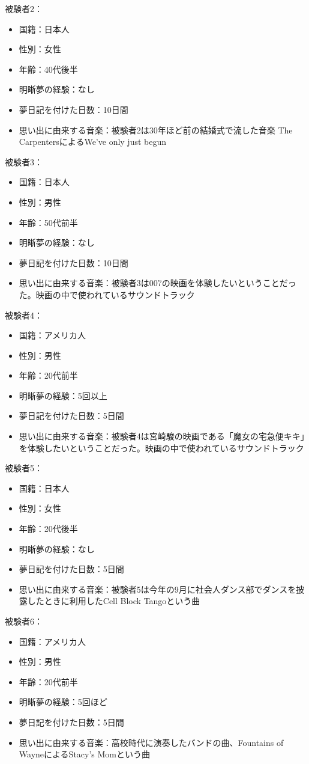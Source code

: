 被験者2：
\begin{itemize}
\item 国籍：日本人
\item 性別：女性
\item 年齢：40代後半
\item 明晰夢の経験：なし
\item 夢日記を付けた日数：10日間
\item 思い出に由来する音楽：被験者2は30年ほど前の結婚式で流した音楽 The CarpentersによるWe've only just begun
\end{itemize}

被験者3：
\begin{itemize}
\item 国籍：日本人
\item 性別：男性
\item 年齢：50代前半
\item 明晰夢の経験：なし
\item 夢日記を付けた日数：10日間
\item 思い出に由来する音楽：被験者3は007の映画を体験したいということだった。映画の中で使われているサウンドトラック
\end{itemize}

被験者4：
\begin{itemize}
\item 国籍：アメリカ人
\item 性別：男性
\item 年齢：20代前半
\item 明晰夢の経験：5回以上
\item 夢日記を付けた日数：5日間
\item 思い出に由来する音楽：被験者4は宮崎駿の映画である「魔女の宅急便キキ」を体験したいということだった。映画の中で使われているサウンドトラック
\end{itemize}

被験者5：
\begin{itemize}
\item 国籍：日本人
\item 性別：女性
\item 年齢：20代後半
\item 明晰夢の経験：なし
\item 夢日記を付けた日数：5日間
\item 思い出に由来する音楽：被験者5は今年の9月に社会人ダンス部でダンスを披露したときに利用したCell Block Tangoという曲
\end{itemize}

被験者6：
\begin{itemize}
\item 国籍：アメリカ人
\item 性別：男性
\item 年齢：20代前半
\item 明晰夢の経験：5回ほど
\item 夢日記を付けた日数：5日間
\item 思い出に由来する音楽：高校時代に演奏したバンドの曲、Fountains of WayneによるStacy's Momという曲
\end{itemize}

